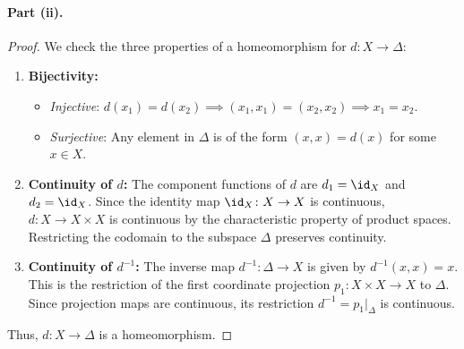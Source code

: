\paragraph{Part (ii).}
\begin{proof}
We check the three properties of a homeomorphism for $d\colon X\to\Delta$:
\begin{enumerate}[label=\arabic*.]
  \item \textbf{Bijectivity:}
    \begin{itemize}
      \item \emph{Injective}: $d(x_1)=d(x_2)\implies(x_1,x_1)=(x_2,x_2)\implies x_1=x_2$.
      \item \emph{Surjective}: Any element in $\Delta$ is of the form $(x,x)=d(x)$ for some
            $x\in X$.
    \end{itemize}
  \item \textbf{Continuity of $d$:}
    The component functions of $d$ are $d_1=\id_X$ and $d_2=\id_X$. Since the identity map
    $\id_X\colon X\to X$ is continuous, $d\colon X\to X\times X$ is continuous by the
    characteristic property of product spaces. Restricting the codomain to the subspace
    $\Delta$ preserves continuity.
  \item \textbf{Continuity of $d^{-1}$:}
    The inverse map $d^{-1}\colon\Delta\to X$ is given by $d^{-1}(x,x)=x$. This is the
    restriction of the first coordinate projection $p_1\colon X\times X\to X$ to $\Delta$.
    Since projection maps are continuous, its restriction $d^{-1}=p_1|_\Delta$ is continuous.
\end{enumerate}
Thus, $d\colon X\to\Delta$ is a homeomorphism.
\end{proof}
